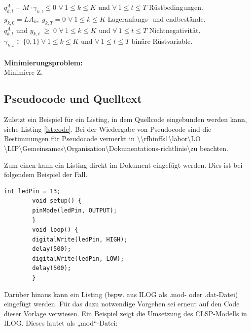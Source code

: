 $q^{A}_{k,t} - M \cdot \gamma_{k,t} \le 0$ $ \forall \ 1 \le k \le K $ und $\forall \ 1 \le t \le T $ \hfill Rüstbedingungen. \\
$y_{k,0} = LA_{k},\; y_{k,T} = 0 $ $ \forall \ 1 \le k \le K $  \hfill Lageranfangs- und endbestände. \\
$q^{A}_{k,t}$ und $y_{k,t} \;\ge\; 0$   $ \forall \ 1 \le k \le K $ und $\forall \ 1 \le t \le T $ \hfill Nichtnegativität. \\
$\gamma_{k,t} \in \{0,1\} ~\forall \ 1 \le k \le K $ und $\forall \ 1 \le t \le T $ \hfill binäre Rüstvariable.\\
\\[0,5em]
\textbf{Minimierungsproblem:} \\
Minimiere Z.


		\subsection{Pseudocode und Quelltext}
		\label{ch:code}
		Zuletzt ein Beispiel für ein Listing, in dem Quellcode eingebunden werden kann, siehe Listing \ref{lst:code}. Bei der Wiedergabe von Pseudocode sind die Bestimmungen für Pseudocode vermerkt in
		\textbackslash\textbackslash rfhinffs1\textbackslash labor\textbackslash LO \textbackslash LIP\textbackslash Gemeinsames\textbackslash Organisation\textbackslash Dokumentations-richtlinie\textbackslash zu beachten. 
		
		Zum einen kann ein Listing direkt im Dokument eingefügt werden. Dies ist bei folgendem Beispiel der Fall.
		\vspace{1em}
		\begin{lstlisting}[caption= Beispielprogramm., label=lst:code]
		int ledPin = 13;
		void setup() {
		pinMode(ledPin, OUTPUT);
		}
		void loop() {
		digitalWrite(ledPin, HIGH);
		delay(500);
		digitalWrite(ledPin, LOW);
		delay(500);
		}
		\end{lstlisting}

		Darüber hinaus kann ein Listing (bspw. aus ILOG als .mod- oder .dat-Datei) eingefügt werden. Für das dazu notwendige Vorgehen sei erneut auf den Code dieser Vorlage verwiesen. Ein Beispiel zeigt die Umsetzung des CLSP-Modells in ILOG. Dieses lautet als „mod“-Datei:\\
		
		
